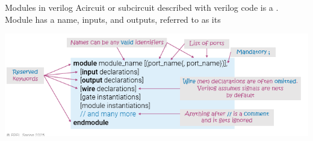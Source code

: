       \begin{parag}{Modules in verilog}
          Acircuit or subcircuit described with verilog code is a . Module has a name, inputs, and outputs, referred to as its 
          \begin{center}
              \includegraphics[scale=0.5]{42025-03-20.png}
          \end{center}
          
      
      \end{parag}
      
